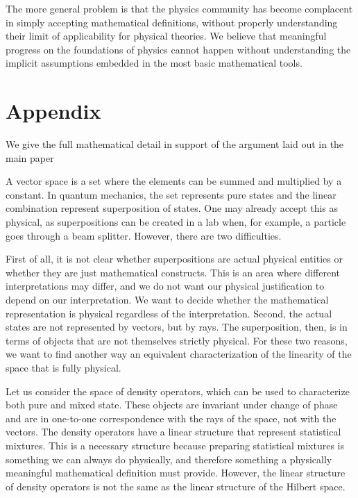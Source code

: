 \documentclass[10pt,twocolumn, nofootinbib]{revtex4-2}
\begin{document}
The more general problem is that the physics community has become complacent in simply accepting mathematical definitions, without properly understanding their limit of applicability for physical theories. We believe that meaningful progress on the foundations of physics cannot happen without understanding the implicit assumptions embedded in the most basic mathematical tools.



\newcommand{\pj}[1] {\underbar{$#1$}}

\section*{Appendix}

We give the full mathematical detail in support of the argument laid out in the main paper




A vector space is a set where the elements can be summed and multiplied by a constant. In quantum mechanics, the set represents pure states and the linear combination represent superposition of states. One may already accept this as physical, as superpositions can be created in a lab when, for example, a particle goes through a beam splitter. However, there are two difficulties.

First of all, it is not clear whether superpositions are actual physical entities or whether they are just mathematical constructs. This is an area where different interpretations may differ, and we do not want our physical justification to depend on our interpretation. We want to decide whether the mathematical representation is physical regardless of the interpretation. Second, the actual states are not represented by vectors, but by rays. The superposition, then, is in terms of objects that are not themselves strictly physical. For these two reasons, we want to find another way an equivalent characterization of the linearity of the space that is fully physical.

Let us consider the space of density operators, which can be used to characterize both pure and mixed state. These objects are invariant under change of phase and are in one-to-one correspondence with the rays of the space, not with the vectors. The density operators have a linear structure that represent statistical mixtures. This is a necessary structure because preparing statistical mixtures is something we can always do physically, and therefore something a physically meaningful mathematical definition must provide. However, the linear structure of density operators is not the same as the linear structure of the Hilbert space.
\end{document}
